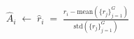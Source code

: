 \begin{align*}
    \hat{A}_{i} \;\leftarrow\; \hat{r}_i
        \;=\; \frac{r_i - \mathrm{mean}(\{r_j\}_{j=1}^G)}{\mathrm{std}(\{r_j\}_{j=1}^G)}
\end{align*}